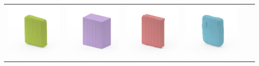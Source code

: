 \documentclass[10pt,onecolumn,letterpaper]{article}
\begin{document}
\begin{tabular}{cccccc}
\includegraphics[height=\turnheight, clip=true, trim=60 30 30 5]{spongebob_squarepants_fruit_snaks_NP2_0_gt_view_90.png} &
\includegraphics[height=\turnheight, clip=true, trim=60 30 30 5]{spongebob_squarepants_fruit_snaks_NP2_0_bb_view_90.png} &
\includegraphics[height=\turnheight, clip=true, trim=60 30 30 5]{spongebob_squarepants_fruit_snaks_NP2_0_zheng_view_90.png} &
\includegraphics[height=\turnheight, clip=true, trim=60 30 30 5]{spongebob_squarepants_fruit_snaks_NP2_0_oma_view_90} \\

\end{tabular}
\end{document}
